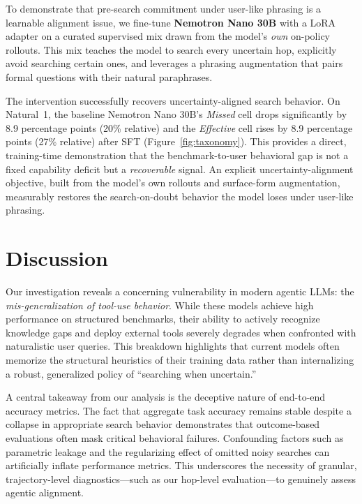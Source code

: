 \documentclass[10pt, letterpaper]{article}
\begin{document}
To demonstrate that pre-search commitment under user-like phrasing is a learnable alignment issue, we fine-tune \textbf{Nemotron Nano 30B} with a LoRA adapter on a curated supervised mix drawn from the model's \emph{own} on-policy rollouts. This mix teaches the model to search every uncertain hop, explicitly avoid searching certain ones, and leverages a phrasing augmentation that pairs formal questions with their natural paraphrases.

The intervention successfully recovers uncertainty-aligned search behavior. On Natural~1, the baseline Nemotron Nano 30B's \emph{Missed} cell drops significantly by 8.9 percentage points (20\% relative) and the \emph{Effective} cell rises by 8.9 percentage points (27\% relative) after SFT (Figure~\ref{fig:taxonomy}). This provides a direct, training-time demonstration that the benchmark-to-user behavioral gap is not a fixed capability deficit but a \emph{recoverable} signal. An explicit uncertainty-alignment objective, built from the model's own rollouts and surface-form augmentation, measurably restores the search-on-doubt behavior the model loses under user-like phrasing.

\section{Discussion}

Our investigation reveals a concerning vulnerability in modern agentic LLMs: the \emph{mis-generalization of tool-use behavior}. While these models achieve high performance on structured benchmarks, their ability to actively recognize knowledge gaps and deploy external tools severely degrades when confronted with naturalistic user queries. This breakdown highlights that current models often memorize the structural heuristics of their training data rather than internalizing a robust, generalized policy of ``searching when uncertain.''

A central takeaway from our analysis is the deceptive nature of end-to-end accuracy metrics. The fact that aggregate task accuracy remains stable despite a collapse in appropriate search behavior demonstrates that outcome-based evaluations often mask critical behavioral failures. Confounding factors such as parametric leakage and the regularizing effect of omitted noisy searches can artificially inflate performance metrics. This underscores the necessity of granular, trajectory-level diagnostics---such as our hop-level evaluation---to genuinely assess agentic alignment.
\end{document}
